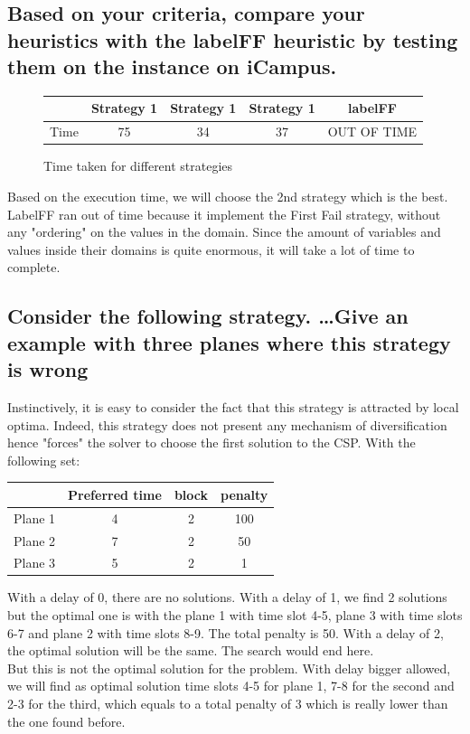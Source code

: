 \documentclass[a4paper ,12pt,french]{article}
\begin{document}
\subsection{Based on your criteria, compare your heuristics with the labelFF heuristic by testing them on the instance on iCampus.}
\begin{figure}[!h]
\begin{tabular}{|c|c|c|c|c|}
\hline
&Strategy 1&Strategy 1&Strategy 1&labelFF\\
\hline
Time&75&34&37&OUT OF TIME\\
\hline
\end{tabular}
\caption{Time taken for different strategies}
\label{Airport}
\end{figure}
Based on the execution time, we will choose the 2nd strategy which is the best. LabelFF ran out of time because it implement the First Fail strategy, without any "ordering" on the values in the domain. Since the amount of variables and values inside their domains is quite enormous, it will take a lot of time to complete.

\subsection{Consider the following strategy. \dots Give an example with three planes where this strategy is wrong}
Instinctively, it is easy to consider the fact that this strategy is attracted by local optima. Indeed, this strategy does not present any mechanism of diversification hence "forces" the solver to choose the first solution to the CSP. 
With the following set: 
\begin{center}


\begin{tabular}{|c|c|c|c|}
\hline 
&Preferred time & block & penalty \\ 
\hline 
Plane 1&4 & 2 & 100\\
\hline 
Plane 2&7 & 2 & 50\\
\hline 
Plane 3&5 & 2 & 1\\
\hline 
\end{tabular} 
\end{center}

With a delay of 0, there are no solutions. With a delay of 1, we find 2  solutions but the optimal one is with the plane 1 with time slot 4-5,  plane 3 with time slots 6-7 and plane 2 with time slots 8-9. The total penalty is 50. With a delay of 2, the optimal solution will be the same. The search would end here.\\
But this is not the optimal solution for the problem. With delay bigger allowed, we will find as optimal solution time slots 4-5 for plane 1, 7-8 for the second and 2-3 for the third, which equals to a total penalty of 3 which is really lower than the one found before.
\end{document}
